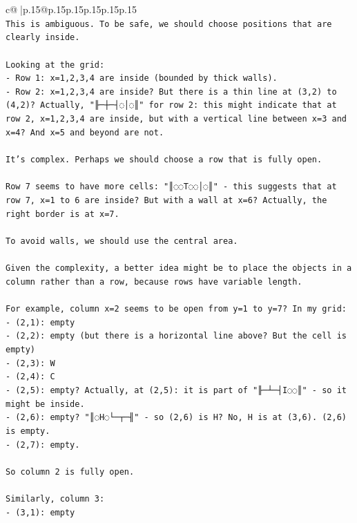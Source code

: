 \documentclass{article}
\begin{document}
{\begin{supertabular}{c@{$\;$}|p{.15\linewidth}@{}p{.15\linewidth}p{.15\linewidth}p{.15\linewidth}p{.15\linewidth}p{.15\linewidth}}
{{{\\ 
\texttt{This is ambiguous. To be safe, we should choose positions that are clearly inside.} \\
\\ 
\texttt{Looking at the grid:} \\
\texttt{{-} Row 1: x=1,2,3,4 are inside (bounded by thick walls).} \\
\texttt{{-} Row 2: x=1,2,3,4 are inside? But there is a thin line at (3,2) to (4,2)? Actually, "╟─┼─┤◌│◌║" for row 2: this might indicate that at row 2, x=1,2,3,4 are inside, but with a vertical line between x=3 and x=4? And x=5 and beyond are not.} \\
\\ 
\texttt{It's complex. Perhaps we should choose a row that is fully open.} \\
\\ 
\texttt{Row 7 seems to have more cells: "║◌◌T◌◌│◌║" {-} this suggests that at row 7, x=1 to 6 are inside? But with a wall at x=6? Actually, the right border is at x=7.} \\
\\ 
\texttt{To avoid walls, we should use the central area.} \\
\\ 
\texttt{Given the complexity, a better idea might be to place the objects in a column rather than a row, because rows have variable length.} \\
\\ 
\texttt{For example, column x=2 seems to be open from y=1 to y=7? In my grid:} \\
\texttt{{-} (2,1): empty} \\
\texttt{{-} (2,2): empty (but there is a horizontal line above? But the cell is empty)} \\
\texttt{{-} (2,3): W} \\
\texttt{{-} (2,4): C} \\
\texttt{{-} (2,5): empty? Actually, at (2,5): it is part of "╟─┴─┤I◌◌║" {-} so it might be inside.} \\
\texttt{{-} (2,6): empty? "║◌H◌└─┬─╢" {-} so (2,6) is H? No, H is at (3,6). (2,6) is empty.} \\
\texttt{{-} (2,7): empty.} \\
\\ 
\texttt{So column 2 is fully open.} \\
\\ 
\texttt{Similarly, column 3: } \\
\texttt{{-} (3,1): empty} \\
}}}
\end{supertabular}}
\end{document}
